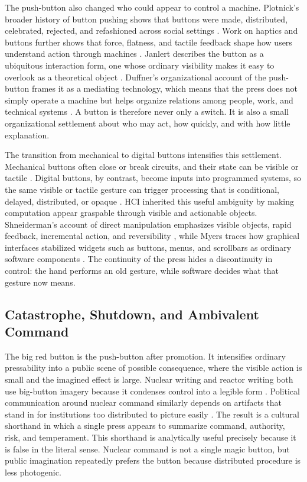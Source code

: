 The push-button also changed who could appear to control a machine. Plotnick's broader history of button pushing shows that buttons were made, distributed, celebrated, rejected, and refashioned across social settings \citep{Plotnick2018}. Work on haptics and buttons further shows that force, flatness, and tactile feedback shape how users understand action through machines \citep{Plotnick2017HapticsButtons}. Janlert describes the button as a ubiquitous interaction form, one whose ordinary visibility makes it easy to overlook as a theoretical object \citep{Janlert2014UbiquitousButton}. Duffner's organizational account of the push-button frames it as a mediating technology, which means that the press does not simply operate a machine but helps organize relations among people, work, and technical systems \citep{Duffner2019PushButtonMediating}. A button is therefore never only a switch. It is also a small organizational settlement about who may act, how quickly, and with how little explanation.

The transition from mechanical to digital buttons intensifies this settlement. Mechanical buttons often close or break circuits, and their state can be visible or tactile \citep{BrathenHerstad2023Pushbutton}. Digital buttons, by contrast, become inputs into programmed systems, so the same visible or tactile gesture can trigger processing that is conditional, delayed, distributed, or opaque \citep{BrathenHerstad2023Pushbutton}. HCI inherited this useful ambiguity by making computation appear graspable through visible and actionable objects. Shneiderman's account of direct manipulation emphasizes visible objects, rapid feedback, incremental action, and reversibility \citep{Shneiderman1983DirectManipulation}, while Myers traces how graphical interfaces stabilized widgets such as buttons, menus, and scrollbars as ordinary software components \citep{Myers1998HistoryHCI}. The continuity of the press hides a discontinuity in control: the hand performs an old gesture, while software decides what that gesture now means.

\subsection{Catastrophe, Shutdown, and Ambivalent Command}

The big red button is the push-button after promotion. It intensifies ordinary pressability into a public scene of possible consequence, where the visible action is small and the imagined effect is large. Nuclear writing and reactor writing both use big-button imagery because it condenses control into a legible form \citep{Tucker2019BigRedButton}. Political communication around nuclear command similarly depends on artifacts that stand in for institutions too distributed to picture easily \citep{Taylor2007NuclearDiscourse}. The result is a cultural shorthand in which a single press appears to summarize command, authority, risk, and temperament. This shorthand is analytically useful precisely because it is false in the literal sense. Nuclear command is not a single magic button, but public imagination repeatedly prefers the button because distributed procedure is less photogenic.

